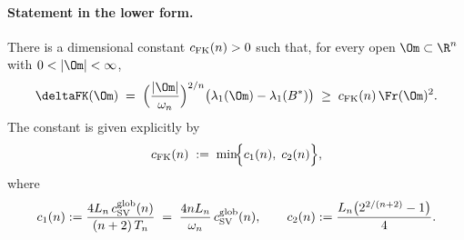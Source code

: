 \paragraph{Statement in the lower form.}

\begin{theorem}
\label{thm:KJ-FK-lower}
There is a dimensional constant $c_{\rm FK}(n)>0$ such that, for
every open $\Om\subset\R^n$ with $0<|\Om|<\infty$,
\begin{equation}\label{eq:KJ-FK-lower}
\deltaFK(\Om)
\;=\;
\Bigl(\frac{|\Om|}{\omega_n}\Bigr)^{2/n}
\bigl(\lambda_1(\Om)-\lambda_1(B^*)\bigr)
\;\ge\; c_{\rm FK}(n)\,\Fr(\Om)^2.
\end{equation}
The constant is given explicitly by
\begin{equation}\label{eq:cFKdef}
c_{\rm FK}(n) \;:=\;
\min\!\Bigl\{
c_1(n),\; c_2(n)
\Bigr\},
\end{equation}
where
\begin{equation}\label{eq:c1c2-def}
c_1(n) := \frac{4 L_n\,c_{\rm SV}^{\rm glob}(n)}{(n+2)\,T_n}
\;=\; \frac{4 n L_n}{\omega_n}\,c_{\rm SV}^{\rm glob}(n),
\qquad
c_2(n) := \frac{L_n\bigl(2^{2/(n+2)}-1\bigr)}{4}.
\end{equation}
\end{theorem}

